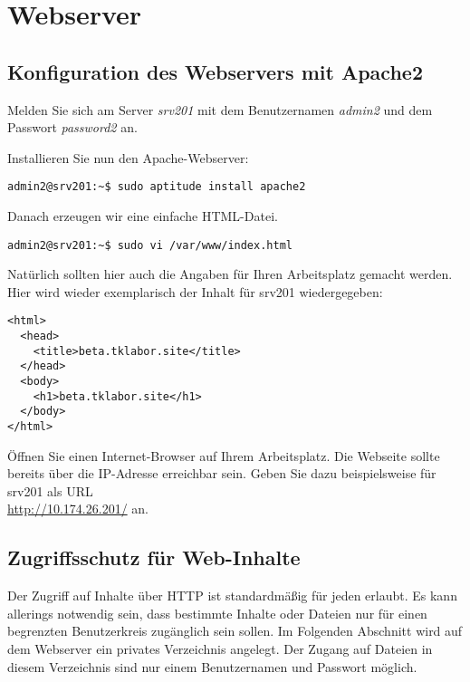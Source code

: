 \section{Webserver}

\subsection{Konfiguration des Webservers mit Apache2}
Melden Sie sich am Server \textit{srv201} mit dem Benutzernamen \textit{admin2}
und dem Passwort \textit{password2} an.

Installieren Sie nun den Apache-Webserver:
\begin{lstlisting}
admin2@srv201:~$ sudo aptitude install apache2
\end{lstlisting}

Danach erzeugen wir eine einfache HTML-Datei.
\begin{lstlisting}
admin2@srv201:~$ sudo vi /var/www/index.html
\end{lstlisting}
Natürlich sollten hier auch die Angaben für Ihren Arbeitsplatz gemacht werden. Hier wird wieder exemplarisch 
der Inhalt für srv201 wiedergegeben:
\begin{scriptsize}
\begin{lstlisting}
<html>
  <head>
    <title>beta.tklabor.site</title>
  </head>  
  <body>
    <h1>beta.tklabor.site</h1>
  </body>
</html>
\end{lstlisting}
\end{scriptsize}
Öffnen Sie einen Internet-Browser auf Ihrem Arbeitsplatz. Die Webseite sollte bereits über die IP-Adresse erreichbar sein. Geben Sie dazu
beispielsweise für srv201 als URL\\
\url{http://10.174.26.201/} an.

\subsection{Zugriffsschutz für Web-Inhalte}
Der Zugriff auf Inhalte über HTTP ist standardmäßig für jeden erlaubt. Es kann
allerings notwendig sein, dass bestimmte Inhalte oder Dateien nur für einen
begrenzten Benutzerkreis zugänglich sein sollen. Im Folgenden Abschnitt wird auf
dem Webserver ein privates Verzeichnis angelegt. Der Zugang auf Dateien in
diesem Verzeichnis sind nur einem Benutzernamen und Passwort möglich.

